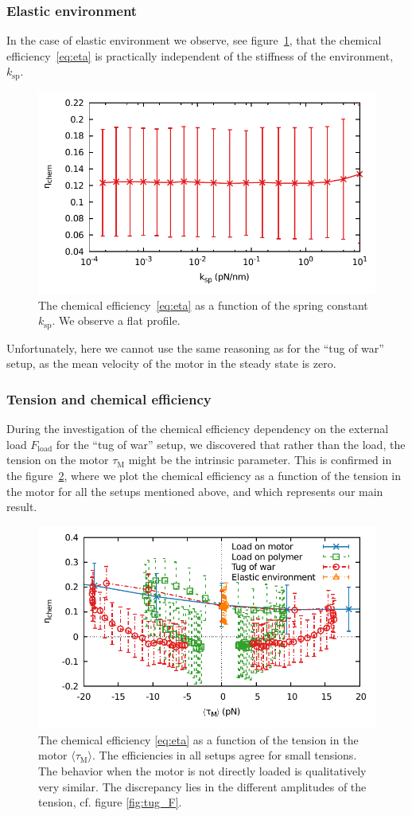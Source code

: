 \documentclass[aps,pre,twocolumn,showpacs,showkeys,superscriptaddress,floatfix]{revtex4-1}
\begin{document}
\subsubsection{Elastic environment}
In the case of elastic environment we observe, see figure~\ref{fig:stiffness_efficiency}, that the chemical efficiency~\eqref{eq:eta} is practically independent of the stiffness of the environment, $k_\text{sp}$. 
\begin{figure}[t]
\centering
\includegraphics[width=.45\textwidth,height=!]{k_eta.pdf}
\caption{\label{fig:stiffness_efficiency}
The chemical efficiency~\eqref{eq:eta} as a function of the spring constant $k_\text{sp}$.
We observe a flat profile.
}
\end{figure}
Unfortunately, here we cannot use the same reasoning as for the ``tug of war'' setup, as the mean velocity of the motor in the steady state is zero. 

\subsubsection{Tension and chemical efficiency}
During the investigation of the chemical efficiency dependency on the external load $F_\text{load}$ for the ``tug of war'' setup, 
we discovered that rather than the load, the tension on the motor $\tau_\text{M}$ might be the intrinsic parameter. 
This is confirmed in the figure~\ref{fig:tension_efficiency}, 
where we plot the chemical efficiency as a function of the tension in the motor for all the setups mentioned above, 
and which represents our main result. 
\begin{figure}[t]
\centering
\includegraphics[width=.45\textwidth,height=!]{tension_eta.pdf}
\caption{\label{fig:tension_efficiency}
The chemical efficiency \eqref{eq:eta} as a function of the tension in the motor $\langle \tau_\text{M} \rangle$.
The efficiencies in all setups agree for small tensions.
The behavior when the motor is not directly loaded is qualitatively very similar.
The discrepancy lies in the different amplitudes of the tension, cf. figure \ref{fig:tug_F}. 
}
\end{figure}
\end{document}
